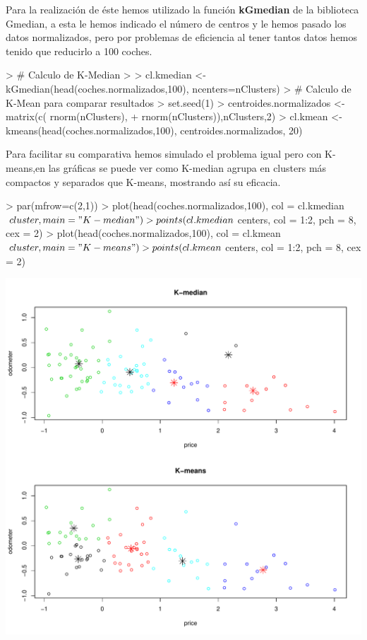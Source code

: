\documentclass[a4paper]{article}
\begin{document}
Para la realización de éste hemos utilizado la función \textbf{kGmedian} de la biblioteca Gmedian, a esta le hemos indicado el número de centros y le hemos pasado los datos normalizados, pero por problemas de eficiencia al tener tantos datos hemos tenido que reducirlo a 100 coches. 
\begin{Schunk}
\begin{Sinput}
> # Calculo de K-Median
> 
> cl.kmedian <- kGmedian(head(coches.normalizados,100), ncenters=nClusters)
> # Calculo de K-Mean para comparar resultados
> set.seed(1)
> centroides.normalizados <-matrix(c( rnorm(nClusters), 
+                                     rnorm(nClusters)),nClusters,2)
> cl.kmean <- kmeans(head(coches.normalizados,100), centroides.normalizados, 20)
\end{Sinput}
\end{Schunk}

Para facilitar su comparativa hemos simulado el problema igual pero con K-means,en las gráficas se puede ver como K-median agrupa en clusters más compactos y separados que K-means, mostrando así su eficacia.

\begin{Schunk}
\begin{Sinput}
> par(mfrow=c(2,1))
> plot(head(coches.normalizados,100), col = cl.kmedian$cluster, main="K-median")
> points(cl.kmedian$centers, col = 1:2, pch = 8, cex = 2)
> plot(head(coches.normalizados,100), col = cl.kmean$cluster, main="K-means")
> points(cl.kmean$centers, col = 1:2, pch = 8, cex = 2)
\end{Sinput}
\end{Schunk}
\includegraphics{Practica4-kmedian}
\end{document}
